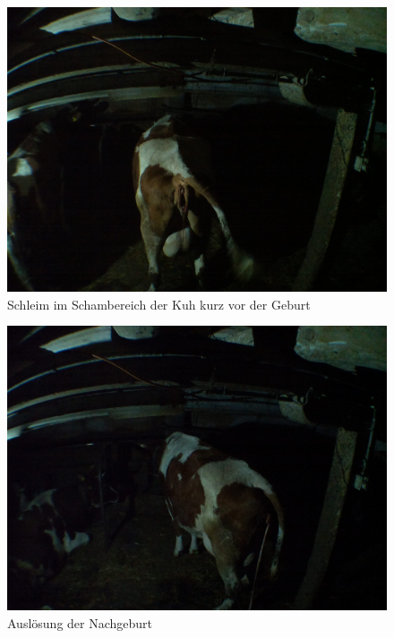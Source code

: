 \begin{figure}[h]
	\center
	\includegraphics[scale=0.075]{Grafiken/schleimvagina.jpg}
	\caption{Schleim im Schambereich der Kuh kurz vor der Geburt} 
	\label{fig: Schleim im Schambereich der Kuh kurz vor der Geburt}
\end{figure}


\begin{figure}[h]
	\center
	\includegraphics[scale=0.075]{Grafiken/schleim.jpg}
	\caption{Auslösung der Nachgeburt} 
	\label{fig: Auslösung der Nachgeburt}
\end{figure}